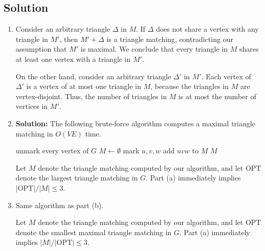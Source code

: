 \documentclass{article}
\begin{document}
\subsection*{Solution}
\begin{enumerate}
    \item Consider an arbitrary triangle $\Delta$ in $M$. If $\Delta$ does not share a vertex with any triangle in $M'$, then $M' + \Delta$ is a triangle matching, contradicting our assumption that $M'$ is maximal. We conclude that every triangle in $M$ shares at least one vertex with a triangle in $M'$.
    
    \vspace{3mm}
    On the other hand, consider an arbitrary triangle $\Delta'$ in $M'$. Each vertex of $\Delta'$ is a vertex of at most one triangle in $M$, because the triangles in $M$ are vertex-disjoint. Thus, the number of triangles in $M$ is at most the number of vertices in $M'$.
    
    \item \noindent \textbf{Solution:} The following brute-force algorithm computes a maximal triangle matching in \(O(VE)\) time.

    \begin{tcolorbox}
    \small
    \begin{algorithmic}
    \State unmark every vertex of \(G\)
    \State \(M \gets \emptyset\)
                    \State mark \(u, v, w\)
                    \State add \(uvw\) to \(M\)
                \EndIf
            \EndFor
        \EndFor
    \EndFor
    \State \Return \(M\)
    \end{algorithmic}
    \end{tcolorbox}

    Let \(M\) denote the triangle matching computed by our algorithm, and let \(\text{OPT}\) denote the largest triangle matching in \(G\). Part (a) immediately implies \(|\text{OPT}|/|M| \leq 3\).

    \item Same algorithm as part (b). 
    
    \vspace{2mm}
    Let \( M \) denote the triangle matching computed by our algorithm, and let \( \text{OPT} \) denote the smallest maximal triangle matching in \( G \). Part (a) immediately implies \( \left| M \right| / \left| \text{OPT} \right| \leq 3. \)

\end{enumerate}
\end{document}
